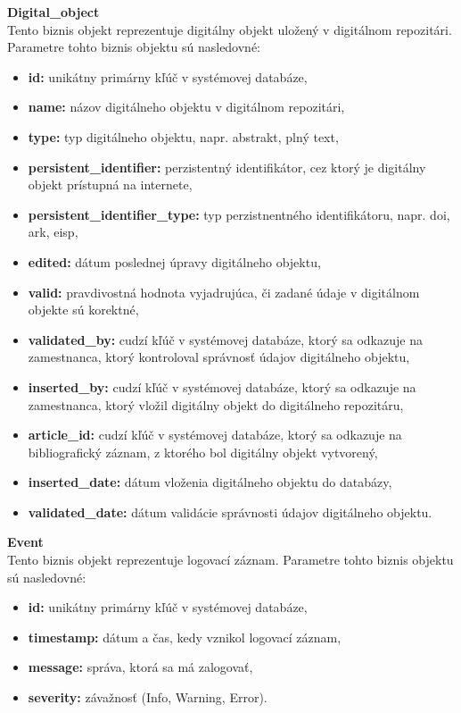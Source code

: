 \documentclass[10pt,oneside,slovak,a4paper]{article}
\begin{document}
\textbf{Digital\_object}\\
Tento biznis objekt reprezentuje digitálny objekt uložený v digitálnom repozitári. Parametre tohto biznis objektu sú nasledovné:

\begin{itemize}
\item \textbf{id:} unikátny primárny kľúč v systémovej databáze,
\item \textbf{name:} názov digitálneho objektu v digitálnom repozitári,
\item \textbf{type:} typ digitálneho objektu, napr. abstrakt, plný text,
\item \textbf{persistent\_identifier:} perzistentný identifikátor, cez ktorý je digitálny objekt prístupná na internete,
\item \textbf{persistent\_identifier\_type:} typ perzistnentného identifikátoru, napr. doi, ark, eisp,
\item \textbf{edited:} dátum poslednej úpravy digitálneho objektu,
\item \textbf{valid:} pravdivostná hodnota vyjadrujúca, či zadané údaje v digitálnom objekte sú korektné,
\item \textbf{validated\_by:} cudzí kľúč v systémovej databáze, ktorý sa odkazuje na zamestnanca, ktorý kontroloval správnosť údajov digitálneho objektu,
\item \textbf{inserted\_by:} cudzí kľúč v systémovej databáze, ktorý sa odkazuje na zamestnanca, ktorý vložil digitálny objekt do digitálneho repozitáru,
\item \textbf{article\_id:} cudzí kľúč v systémovej databáze, ktorý sa odkazuje na bibliografický záznam, z ktorého bol digitálny objekt vytvorený,
\item \textbf{inserted\_date:} dátum vloženia digitálneho objektu do databázy,
\item \textbf{validated\_date:} dátum validácie správnosti údajov digitálneho objektu.
\end{itemize} 

\textbf{Event}\\
Tento biznis objekt reprezentuje logovací záznam. Parametre tohto biznis objektu sú nasledovné:

\begin{itemize}
\item \textbf{id:} unikátny primárny kľúč v systémovej databáze,
\item \textbf{timestamp:} dátum a čas, kedy vznikol logovací záznam,
\item \textbf{message:} správa, ktorá sa má zalogovať,
\item \textbf{severity:} závažnosť (Info, Warning, Error).
\end{itemize}
\end{document}
